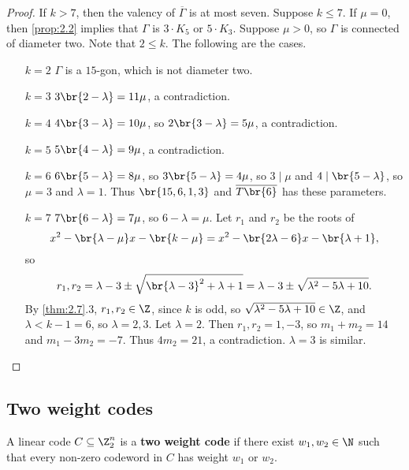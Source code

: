 \begin{proof}
If $ k > 7 $, then the valency of $ \overline{\Gamma} $ is at most seven. Suppose $ k \le 7 $. If $ \mu = 0 $, then \ref{prop:2.2} implies that $ \Gamma $ is $ 3 \cdot K_5 $ or $ 5 \cdot K_3 $. Suppose $ \mu > 0 $, so $ \Gamma $ is connected of diameter two. Note that $ 2 \le k $. The following are the cases.
\begin{enumerate}[leftmargin=0.5in]
\item[$ k = 2 $] $ \Gamma $ is a $ 15 $-gon, which is not diameter two.
\item[$ k = 3 $] $ 3\br{2 - \lambda} = 11\mu $, a contradiction.
\item[$ k = 4 $] $ 4\br{3 - \lambda} = 10\mu $, so $ 2\br{3 - \lambda} = 5\mu $, a contradiction.
\item[$ k = 5 $] $ 5\br{4 - \lambda} = 9\mu $, a contradiction.
\item[$ k = 6 $] $ 6\br{5 - \lambda} = 8\mu $, so $ 3\br{5 - \lambda} = 4\mu $, so $ 3 \mid \mu $ and $ 4 \mid \br{5 - \lambda} $, so $ \mu = 3 $ and $ \lambda = 1 $. Thus $ \br{15, 6, 1, 3} $ and $ \overline{T\br{6}} $ has these parameters.
\item[$ k = 7 $] $ 7\br{6 - \lambda} = 7\mu $, so $ 6 - \lambda = \mu $. Let $ r_1 $ and $ r_2 $ be the roots of
$$ x^2 - \br{\lambda - \mu}x - \br{k - \mu} = x^2 - \br{2\lambda - 6}x - \br{\lambda + 1}, $$
so
$$ r_1, r_2 = \lambda - 3 \pm \sqrt{\br{\lambda - 3}^2 + \lambda + 1} = \lambda - 3 \pm \sqrt{\lambda^2 - 5\lambda + 10}. $$
By \ref{thm:2.7}.$ 3 $, $ r_1, r_2 \in \Z $, since $ k $ is odd, so $ \sqrt{\lambda^2 - 5\lambda + 10} \in \Z $, and $ \lambda < k - 1 = 6 $, so $ \lambda = 2, 3 $. Let $ \lambda = 2 $. Then $ r_1, r_2 = 1, -3 $, so $ m_1 + m_2 = 14 $ and $ m_1 - 3m_2 = -7 $. Thus $ 4m_2 = 21 $, a contradiction. $ \lambda = 3 $ is similar.
\end{enumerate}
\end{proof}

\pagebreak

\subsection{Two weight codes}


\begin{definition*}
A linear code $ C \subseteq \Z_2^n $ is a \textbf{two weight code} if there exist $ w_1, w_2 \in \N $ such that every non-zero codeword in $ C $ has weight $ w_1 $ or $ w_2 $.
\end{definition*}

